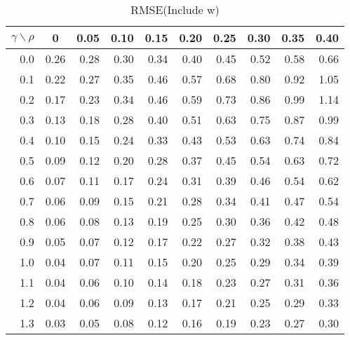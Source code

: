 \documentclass[12pt]{article}
\begin{document}
%
\begin{table}[!tbp]
\caption{RMSE(Include w)}
 \begin{center}
 \begin{tabular}{r|rrrrrrrrr}\hline\hline
\multicolumn{1}{c|}{$\gamma\backslash\rho$}&\multicolumn{1}{c}{0}&\multicolumn{1}{c}{0.05}&\multicolumn{1}{c}{0.10}&\multicolumn{1}{c}{0.15}&\multicolumn{1}{c}{0.20}&\multicolumn{1}{c}{0.25}&\multicolumn{1}{c}{0.30}&\multicolumn{1}{c}{0.35}&\multicolumn{1}{c}{0.40}\tabularnewline
\hline

0.0&0.26&0.28&0.30&0.34&0.40&0.45&0.52&0.58&0.66\tabularnewline
0.1&0.22&0.27&0.35&0.46&0.57&0.68&0.80&0.92&1.05\tabularnewline
0.2&0.17&0.23&0.34&0.46&0.59&0.73&0.86&0.99&1.14\tabularnewline
0.3&0.13&0.18&0.28&0.40&0.51&0.63&0.75&0.87&0.99\tabularnewline
0.4&0.10&0.15&0.24&0.33&0.43&0.53&0.63&0.74&0.84\tabularnewline
0.5&0.09&0.12&0.20&0.28&0.37&0.45&0.54&0.63&0.72\tabularnewline
0.6&0.07&0.11&0.17&0.24&0.31&0.39&0.46&0.54&0.62\tabularnewline
0.7&0.06&0.09&0.15&0.21&0.28&0.34&0.41&0.47&0.54\tabularnewline
0.8&0.06&0.08&0.13&0.19&0.25&0.30&0.36&0.42&0.48\tabularnewline
0.9&0.05&0.07&0.12&0.17&0.22&0.27&0.32&0.38&0.43\tabularnewline
1.0&0.04&0.07&0.11&0.15&0.20&0.25&0.29&0.34&0.39\tabularnewline
1.1&0.04&0.06&0.10&0.14&0.18&0.23&0.27&0.31&0.36\tabularnewline
1.2&0.04&0.06&0.09&0.13&0.17&0.21&0.25&0.29&0.33\tabularnewline
1.3&0.03&0.05&0.08&0.12&0.16&0.19&0.23&0.27&0.30\tabularnewline

\hline
\end{tabular}

\end{center}

\end{table}
\end{document}
